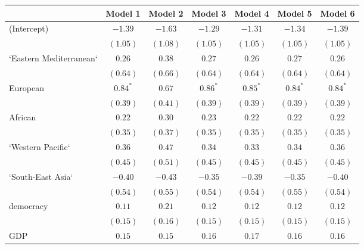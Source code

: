 
\begin{table}[!h]
\begin{center}
\begin{tabular}{l c c c c c c }
\toprule
 & Model 1 & Model 2 & Model 3 & Model 4 & Model 5 & Model 6 \\
\midrule
(Intercept)             & $-1.39$      & $-1.63$      & $-1.29$      & $-1.31$      & $-1.34$      & $-1.39$      \\
                        & $(1.05)$     & $(1.08)$     & $(1.05)$     & $(1.05)$     & $(1.05)$     & $(1.05)$     \\
`Eastern Mediterranean` & $0.26$       & $0.38$       & $0.27$       & $0.26$       & $0.27$       & $0.26$       \\
                        & $(0.64)$     & $(0.66)$     & $(0.64)$     & $(0.64)$     & $(0.64)$     & $(0.64)$     \\
European                & $0.84^{*}$   & $0.67$       & $0.86^{*}$   & $0.85^{*}$   & $0.84^{*}$   & $0.84^{*}$   \\
                        & $(0.39)$     & $(0.41)$     & $(0.39)$     & $(0.39)$     & $(0.39)$     & $(0.39)$     \\
African                 & $0.22$       & $0.30$       & $0.23$       & $0.22$       & $0.22$       & $0.22$       \\
                        & $(0.35)$     & $(0.37)$     & $(0.35)$     & $(0.35)$     & $(0.35)$     & $(0.35)$     \\
`Western Pacific`       & $0.36$       & $0.47$       & $0.34$       & $0.33$       & $0.34$       & $0.36$       \\
                        & $(0.45)$     & $(0.51)$     & $(0.45)$     & $(0.45)$     & $(0.45)$     & $(0.45)$     \\
`South-East Asia`       & $-0.40$      & $-0.43$      & $-0.35$      & $-0.39$      & $-0.35$      & $-0.40$      \\
                        & $(0.54)$     & $(0.55)$     & $(0.54)$     & $(0.54)$     & $(0.55)$     & $(0.54)$     \\
democracy               & $0.11$       & $0.21$       & $0.12$       & $0.12$       & $0.12$       & $0.12$       \\
                        & $(0.15)$     & $(0.16)$     & $(0.15)$     & $(0.15)$     & $(0.15)$     & $(0.15)$     \\
GDP                     & $0.15$       & $0.15$       & $0.16$       & $0.17$       & $0.16$       & $0.16$       \\

\end{tabular}
\end{center}
\end{table}
